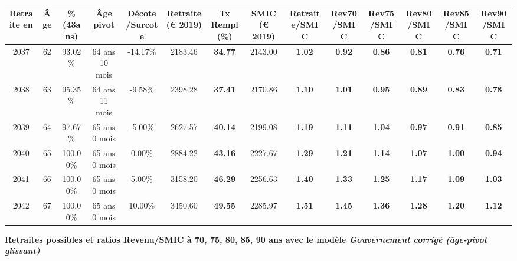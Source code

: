 \begin{adjustbox}{max width=\textwidth} 
\begin{tabular}[htb]{|c|c||c|c|c||c|c||c||c|c|c|c|c|c|} 
\hline 
 Retraite en &  Âge &  \%(43ans) &  Âge pivot &  Décote/Surcote &  Retraite (\euro{} 2019) &  Tx Rempl(\%) &  SMIC (\euro{} 2019) &  Retraite/SMIC &  Rev70/SMIC &  Rev75/SMIC &  Rev80/SMIC &  Rev85/SMIC &  Rev90/SMIC \\ 
\hline \hline 
 2037 &  62 &  93.02\% &  64 ans 10 mois &  -14.17\% &  2183.46 &  {\bf 34.77} &  2143.00 &  {\bf 1.02} &  {\bf {\color{red} 0.92}} &  {\bf {\color{red} 0.86}} &  {\bf {\color{red} 0.81}} &  {\bf {\color{red} 0.76}} &  {\bf {\color{red} 0.71}} \\ 
\hline 
 2038 &  63 &  95.35\% &  64 ans 11 mois &  -9.58\% &  2398.28 &  {\bf 37.41} &  2170.86 &  {\bf 1.10} &  {\bf 1.01} &  {\bf {\color{red} 0.95}} &  {\bf {\color{red} 0.89}} &  {\bf {\color{red} 0.83}} &  {\bf {\color{red} 0.78}} \\ 
\hline 
 2039 &  64 &  97.67\% &  65 ans 0 mois &  -5.00\% &  2627.57 &  {\bf 40.14} &  2199.08 &  {\bf 1.19} &  {\bf 1.11} &  {\bf 1.04} &  {\bf {\color{red} 0.97}} &  {\bf {\color{red} 0.91}} &  {\bf {\color{red} 0.85}} \\ 
\hline 
 2040 &  65 &  100.00\% &  65 ans 0 mois &  0.00\% &  2884.22 &  {\bf 43.16} &  2227.67 &  {\bf 1.29} &  {\bf 1.21} &  {\bf 1.14} &  {\bf 1.07} &  {\bf {\color{red} 1.00}} &  {\bf {\color{red} 0.94}} \\ 
\hline 
 2041 &  66 &  100.00\% &  65 ans 0 mois &  5.00\% &  3158.20 &  {\bf 46.29} &  2256.63 &  {\bf 1.40} &  {\bf 1.33} &  {\bf 1.25} &  {\bf 1.17} &  {\bf 1.09} &  {\bf 1.03} \\ 
\hline 
 2042 &  67 &  100.00\% &  65 ans 0 mois &  10.00\% &  3450.60 &  {\bf 49.55} &  2285.97 &  {\bf 1.51} &  {\bf 1.45} &  {\bf 1.36} &  {\bf 1.28} &  {\bf 1.20} &  {\bf 1.12} \\ 
\hline 
\hline 
\end{tabular} 
\end{adjustbox} 
 
 \vspace{0.1cm} 
{\bf \noindent Retraites possibles et ratios Revenu/SMIC à 70, 75, 80, 85, 90 ans avec le modèle \emph{Gouvernement corrigé (âge-pivot glissant)}}  
 
